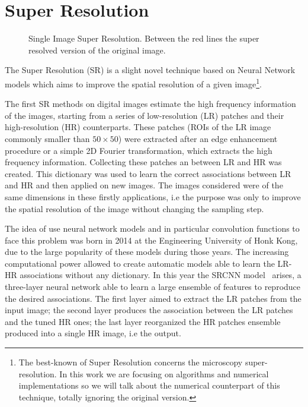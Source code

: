 \documentclass{standalone}
\begin{document}
\section[Super Resolution]{Super Resolution}\label{SR:sr}

\begin{figure}[htbp]
\def\svgwidth{0.5\textwidth}

\quad
\def\svgwidth{0.465\textwidth}

\caption{Single Image Super Resolution.
Between the red lines the super resolved version of the original image.
}
\label{fig:sr_wow}
\end{figure}

The Super Resolution (SR) is a slight novel technique based on Neural Network models which aims to improve the spatial resolution of a given image\footnote{
  The best-known  of Super Resolution concerns the microscopy super-resolution.
  In this work we are focusing on algorithms and numerical implementations so we will talk about the numerical counterpart of this technique, totally ignoring the original  version.
}.

The first SR methods on digital images estimate the high frequency information of the images, starting from a series of low-resolution (LR) patches and their high-resolution (HR) counterparts.
These patches (ROIs of the LR image commonly smaller than $50\times50$) were extracted after an edge enhancement procedure or a simple 2D Fourier transformation, which extracts the high frequency information.
Collecting these patches an  between LR and HR was created.
This dictionary was used to learn the correct associations between LR and HR and then applied on new images.
The images considered were of the same dimensions in these firstly applications, i.e the purpose was only to improve the spatial resolution of the image without changing the sampling step.

The idea of use neural network models and in particular convolution functions to face this problem was born in 2014 at the Engineering University of Honk Kong, due to the large popularity of these models during those years.
The increasing computational power allowed to create automatic models able to learn the LR-HR associations without any dictionary.
In this year the SRCNN model~\cite{SRCNN} arises, a three-layer neural network able to learn a large ensemble of features to reproduce the desired associations.
The first layer aimed to extract the LR patches from the input image; the second layer produces the association between the LR patches and the tuned HR ones; the last layer reorganized the HR patches ensemble produced into a single HR image, i.e the output.
\end{document}
